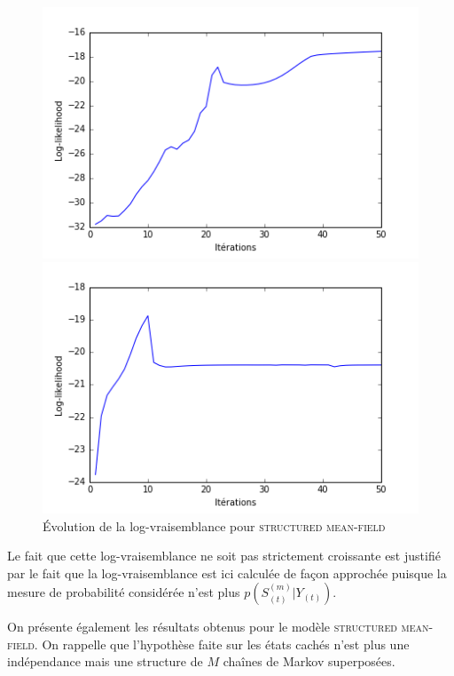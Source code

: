 \documentclass[10pt,a4paper]{article}
\newcommand{\meanfield}{\textsc{mean-field}}
\newcommand{\structmeanfield}{\textsc{structured mean-field}}
\begin{document}
\begin{figure}[H]
\centering
\begin{minipage}{.45\linewidth}
\centering
\includegraphics[scale=0.3]{../resources/pictures/M3_K2_meanfield.png}
\caption{Évolution de la log-vraisemblance pour \meanfield}
\end{minipage}
\begin{minipage}{.45\linewidth}
\centering
\includegraphics[scale=0.3]{../resources/pictures/M3_K2_structmeanfield.png}
\caption{Évolution de la log-vraisemblance pour \structmeanfield}
\end{minipage}
\end{figure}

Le fait que cette log-vraisemblance ne soit pas strictement croissante est 
justifié par le fait que la log-vraisemblance est ici calculée de façon
approchée puisque la mesure de probabilité considérée n'est plus 
$p(S_{(t)}^{(m)} \vert Y_{(t)})$.

On présente également les résultats obtenus pour le modèle \structmeanfield. On rappelle
que l'hypothèse faite sur les états cachés n'est plus une indépendance mais une structure
 de $M$ chaînes de Markov superposées. 
\end{document}
